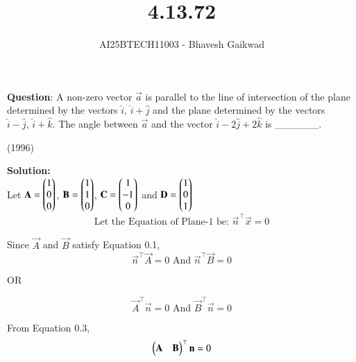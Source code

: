 \documentclass[journal]{IEEEtran}
\begin{document}

\vspace{3cm}

\title{4.13.72}
\author{AI25BTECH11003 - Bhavesh Gaikwad}
{\let\newpage\relax\maketitle}

\renewcommand{\thefigure}{\theenumi}
\renewcommand{\thetable}{\theenumi}
\setlength{\intextsep}{10pt} 


\renewcommand{\thetable}{\theenumi}


\textbf{Question}: 
A non-zero vector $\vec{a}$ is parallel to the line of intersection of the plane determined by the vectors $\hat{i}, \, \hat{i} + \hat{j}$ and the plane determined by the vectors $\hat{i} - \hat{j}, \, \hat{i} + \hat{k}$. The angle between $\vec{a}$ and the vector $\hat{i} - 2\hat{j} + 2\hat{k}$ is \_\_\_\_\_\_.

\hfill{(1996)}

\textbf{Solution:}\\
Let $\mathbf{A}=\begin{pmatrix}1 \\ 0 \\0\end{pmatrix}$, $\mathbf{B}=\begin{pmatrix}1 \\ 1 \\ 0\end{pmatrix}$, $\mathbf{C}=\begin{pmatrix}1 \\ -1 \\ 0\end{pmatrix}$ and $\mathbf{D}=\begin{pmatrix}1 \\ 0 \\ 1\end{pmatrix}$\\

\begin{equation}
\text{Let the Equation of Plane-1 be: } \vec{n}^\top\vec{x}=0
\end{equation}

Since $\vec{A}$ and $\vec{B}$ satisfy Equation 0.1,
\begin{equation}
    \vec{n}^\top\vec{A}=0 \text{ And } \vec{n}^\top\vec{B}=0
\end{equation}

\begin{center}
    OR
\end{center}

\begin{equation}
    \vec{A}^\top\vec{n}=0 \text{ And } \vec{B}^\top\vec{n}=0
\end{equation}

From Equation 0.3,
\begin{equation}
    \begin{pmatrix}\mathbf{A} & \mathbf{B}\end{pmatrix}^\top \mathbf{n} = 0
\end{equation}
\end{document}

